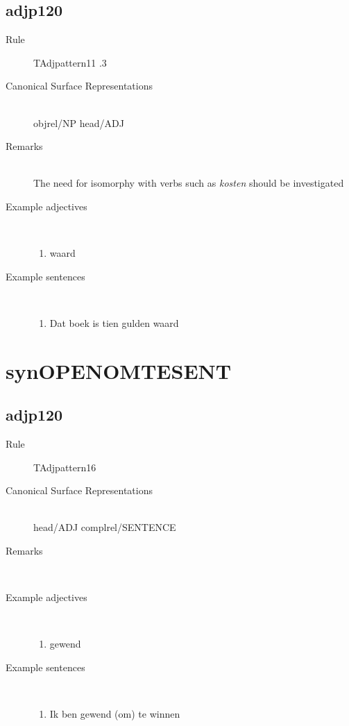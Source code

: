 \subsection{adjp120}
\begin{description}
  \item [Rule] TAdjpattern11 .3
  \item [Canonical Surface Representations]\mbox{}\\  objrel/NP head/ADJ
  \item [Remarks] \mbox{}\\ The need for 
isomorphy with verbs such as {\em kosten} should be investigated
  \item [Example adjectives] \mbox{}\\
\begin{enumerate}
  \item waard
\end{enumerate}
  \item [Example sentences] \mbox{}\\
\begin{enumerate}
  \item Dat boek is tien gulden waard
\end{enumerate}
\end{description}
\newpage
\section{synOPENOMTESENT}
\subsection{adjp120}
\begin{description}
  \item [Rule] TAdjpattern16
  \item [Canonical Surface Representations]\mbox{}\\head/ADJ complrel/SENTENCE

  \item [Remarks] \mbox{}\\ 
  \item [Example adjectives] \mbox{}\\
\begin{enumerate}
  \item gewend
\end{enumerate}
  \item [Example sentences] \mbox{}\\
\begin{enumerate}
  \item Ik ben gewend (om) te winnen
\end{enumerate}
\end{description}
\newpage
